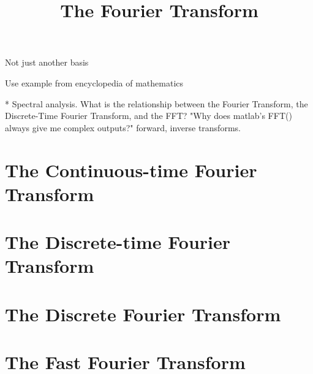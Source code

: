 

\title{The Fourier Transform}

Not just another basis

Use example from encyclopedia of mathematics


* Spectral analysis. What is the relationship between the Fourier
  Transform, the Discrete-Time Fourier Transform, and the FFT? "Why
  does matlab’s FFT() always give me complex outputs?" forward,
  inverse transforms.


\section{The Continuous-time Fourier Transform}


\section{The Discrete-time Fourier Transform}


\section{The Discrete Fourier Transform}


\section{The Fast Fourier Transform}

